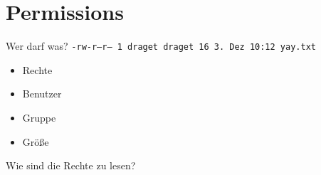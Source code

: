 \section[Permissions]{Permissions}
\begin{frame}{Wer darf was?}
\texttt{\small -rw-r--r-- 1 draget draget 16  3. Dez 10:12 yay.txt}
\begin{itemize}
\item Rechte
\item Benutzer
\item Gruppe
\item Größe
\end{itemize}

\vspace{1cm}
Wie sind die Rechte zu lesen?
\end{frame}

